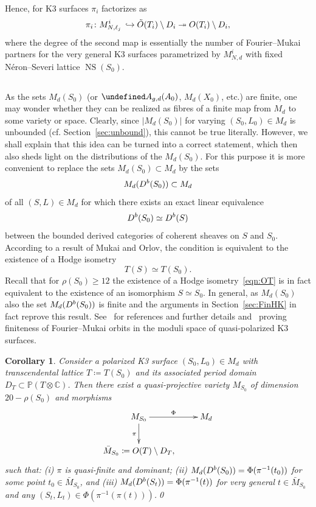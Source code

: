 \documentclass[11pt]{article}
\newtheorem{coro}[theo]{Corollary}
\theoremstyle{definition}
\numberwithin{equation}{section}
\numberwithin{figure}{section}
\numberwithin{table}{section}
\let\cal\undefined
\DeclareMathOperator{\NS}{NS}
\newcommand{\Db}{{\rm D}^{\rm b}}
\newcommand{\OO}{{\rm O}}
\newcommand{\cal}{\mathcal}
\newcommand{\ka}{{\cal A}}
\newcommand{\CC}{\mathbb{C}}
\newcommand{\PP}{\mathbb{P}}
\renewcommand{\cong}{\simeq}
\begin{document}
Hence, for K3 surfaces $\pi_i$ factorizes as
\[
\pi_i\colon M^i_{N,\ell_j}\,\hookrightarrow \tilde \OO(T_i)\setminus D_i\twoheadrightarrow \OO(T_i)\setminus
D_i,
\]
where the degree of the second map is essentially the number of Fourier--Mukai partners for the very general K3 surfaces
parametrized by $M^i_{N,d}$ with fixed N\'eron--Severi lattice $\NS(S_0)$.

\subsection{}
As the sets $M_d(S_0)$ (or $\ka_{g,d}(A_0)$, $M_d(X_0)$, etc.) are finite, one may wonder whether they can be realized as fibres of a finite map from $M_d$ to some variety or space. Clearly, since $|M_d(S_0)|$ for varying $(S_0,L_0)\in M_d$ is unbounded (cf. Section~\ref{sec:unbound}), this cannot be true literally. However, we shall explain that this idea can be turned into a correct statement, which then also sheds light on the distributions of the $M_d(S_0)$. For this purpose it is more convenient to replace the sets $M_d(S_0)\subset M_d$ by the sets
\[
M_d(\Db(S_0))\subset M_d
\]
of all
$(S,L)\in M_d$ for which there exists an exact linear equivalence
\begin{equation}\label{eqn:FM}
\Db(S_0)\cong \Db(S)
\end{equation}
between the bounded derived categories of coherent sheaves on $S$ and $S_0$. According to a result of Mukai and Orlov, the condition is equivalent to the existence of a Hodge isometry
\begin{equation}\label{eqn:OT}
T(S)\cong T(S_0).
\end{equation}
Recall that for $\rho(S_0)\geq 12$ the existence of a Hodge isometry~\eqref{eqn:OT} is in fact equivalent to the existence of an isomorphism $S\cong S_0$. In general, as $M_d(S_0)$ also the set $M_d(\Db(S_0))$ is finite and the arguments in Section~\ref{sec:FinHK} in fact reprove this result. See~\cite[Chapter~16]{HuyK3} for references and further details and~\cite{HP} proving finiteness of Fourier--Mukai orbits in the moduli space of quasi-polarized K3 surfaces.

\begin{coro}\label{cor:parOS}
Consider a polarized K3 surface $(S_0,L_0)\in M_d$ with transcendental lattice $T\coloneqq T(S_0)$ and its associated period domain $D_T\subset\PP(T\otimes\CC)$. Then there exist a quasi-projective variety $M_{S_0}$ of dimension~$20-\rho(S_0)$ and morphisms
\[
\xymatrix{M_{S_0}\ar[r]^-\Phi\ar[d]_\pi&M_d\\
\bar M_{S_0}\coloneqq \OO(T)\setminus D_T,&}
\]
such that: {\rm (i)} $\pi$ is quasi-finite and dominant; {\rm (ii)} $M_d(\Db(S_0))=\Phi(\pi^{-1}(t_0))$ for some point $t_0\in \bar M_{S_0}$, and {\rm (iii)} $M_d(\Db(S_t))=\Phi(\pi^{-1}(t))$ for very general $t\in\bar M_{S_0}$ and any $(S_t,L_t)\in\Phi(\pi^{-1}(\pi(t)))$.\qed
\end{coro}
\end{document}
